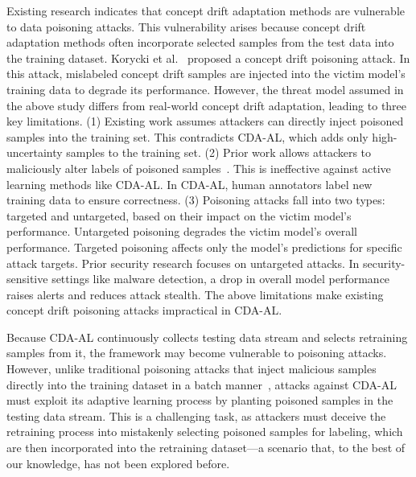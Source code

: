 \documentclass[lettersize,journal]{IEEEtran}
\begin{document}
Existing research indicates that concept drift adaptation methods are vulnerable to data poisoning attacks.
This vulnerability arises because concept drift adaptation methods often incorporate selected samples from the test data into the training dataset.
Korycki et al.~\cite{2023-CCF-B-Adversarial-concept-drift-detection-under-poisoning-attacks} proposed a concept drift poisoning attack. In this attack, mislabeled concept drift samples are injected into the victim model’s training data to degrade its performance.
However, the threat model assumed in the above study differs from real-world concept drift adaptation, leading to three key limitations.
(1) Existing work assumes attackers can directly inject poisoned samples into the training set.
This contradicts CDA-AL, which adds only high-uncertainty samples to the training set.
(2) Prior work allows attackers to maliciously alter labels of poisoned samples~\cite{2022-ACM-Computing-Survey-Threats-to-training}. This is ineffective against active learning methods like CDA-AL. In CDA-AL, human annotators label new training data to ensure correctness.
(3) Poisoning attacks fall into two types: targeted and untargeted, based on their impact on the victim model’s performance.
Untargeted poisoning degrades the victim model’s overall performance. Targeted poisoning affects only the model’s predictions for specific attack targets.
Prior security research focuses on untargeted attacks.
In security-sensitive settings like malware detection, a drop in overall model performance raises alerts and reduces attack stealth.
The above limitations make existing concept drift poisoning attacks impractical in CDA-AL.

Because CDA-AL continuously collects testing data stream and selects retraining samples from it, the framework may become vulnerable to poisoning attacks. 
However, unlike traditional poisoning attacks that inject malicious samples directly into the training dataset in a batch manner~\cite{2022-ACM-Computing-Survey-Threats-to-training, 2024-SP-Offline-RL-Backdoor,2018-NIPS-Poison-frogs,2018-SP-poisoning-regression,2024-TIFS-Backdoor-Contrastive-Learning}, attacks against CDA-AL must exploit its adaptive learning process by planting poisoned samples in the testing data stream. 
This is a challenging task, as attackers must deceive the retraining process into mistakenly selecting poisoned samples for labeling, which are then incorporated into the retraining dataset—a scenario that, to the best of our knowledge, has not been explored before.
\end{document}
